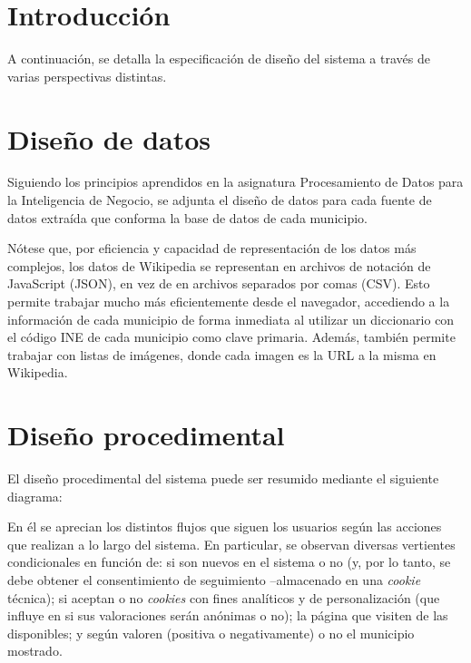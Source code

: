 
\section{Introducción}

A continuación, se detalla la especificación de diseño del sistema a través de varias perspectivas distintas.

\section{Diseño de datos}

Siguiendo los principios aprendidos en la asignatura \guillemotleft Procesamiento de Datos para la Inteligencia de Negocio\guillemotright, se adjunta el diseño de datos para cada fuente de datos extraída que conforma la base de datos de cada municipio.


Nótese que, por eficiencia y capacidad de representación de los datos más complejos, los datos de Wikipedia se representan en archivos de notación de JavaScript (JSON), en vez de en archivos separados por comas (CSV). Esto permite trabajar mucho más eficientemente desde el navegador, accediendo a la información de cada municipio de forma inmediata al utilizar un diccionario con el código INE de cada municipio como clave primaria. Además, también permite trabajar con listas de imágenes, donde cada imagen es la URL a la misma en Wikipedia.

\section{Diseño procedimental}

El diseño procedimental del sistema puede ser resumido mediante el siguiente diagrama:


En él se aprecian los distintos flujos que siguen los usuarios según las acciones que realizan a lo largo del sistema. En particular, se observan diversas vertientes condicionales en función de: si son nuevos en el sistema o no (y, por lo tanto, se debe obtener el consentimiento de seguimiento –almacenado en una \textit{cookie} técnica); si aceptan o no \textit{cookies} con fines analíticos y de personalización (que influye en si sus valoraciones serán anónimas o no); la página que visiten de las disponibles; y según valoren (positiva o negativamente) o no el municipio mostrado.

